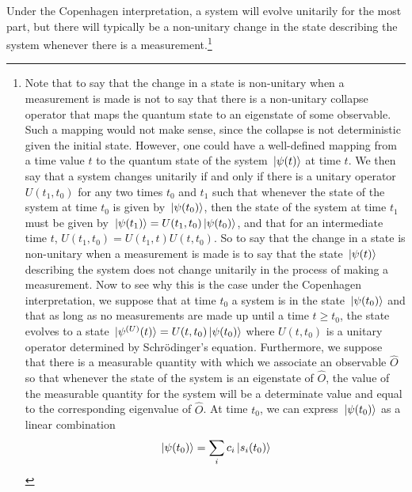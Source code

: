 Under the Copenhagen interpretation, a system will evolve unitarily for the most part, but there will typically be a non-unitary change in the state describing the system whenever there is a measurement.\footnote{Note that to say that the change in a state is non-unitary when a measurement is made is not to say that there is a non-unitary collapse operator that maps the quantum state to an eigenstate of some observable. Such a mapping would not make sense, since the collapse is not deterministic given the initial state. However, one could have a well-defined mapping from a time value $t$ to the quantum state of the system $\ket*{\psi(t)}$ at time $t$. We then say that a system changes unitarily if and only if there is a unitary operator $U(t_1,t_0)$ for any two times $t_0$ and $t_1$ such that whenever the state of the system at time $t_0$ is given by $\ket*{\psi(t_0)}$, then the state of the system at time $t_1$ must be given by $\ket*{\psi(t_1)}=U(t_1, t_0)\ket*{\psi(t_0)}$, and that for an intermediate time $t$, $U(t_1,t_0)=U(t_1, t)U(t, t_0).$ So to say that the change in a state is non-unitary when a measurement is made is to say that the state $\ket*{\psi(t)}$ describing the system does not change unitarily in the process of making a measurement. Now to see why this is the case under the Copenhagen interpretation, we suppose that at time $t_0$ a system is in the state $\ket*{\psi(t_0)}$ and that as long as no measurements are made up until a time $t\geq t_0$, the state evolves to a state $\ket*{\psi^{(U)}(t)}=U(t,t_0)\ket*{\psi(t_0)}$ where $U(t,t_0)$ is a unitary operator determined by Schr\"{o}dinger's equation. Furthermore, we suppose that there is a measurable quantity with which we associate an observable $\hat{O}$ so that whenever the state of the system is an eigenstate of $\hat{O}$, the value of the measurable quantity for the system will be a determinate value and equal to the corresponding eigenvalue of $\hat{O}$. At time $t_0$, we can express $\ket*{\psi(t_0)}$ as a linear combination
  $$\ket*{\psi(t_0)}=\sum_i c_i\ket*{s_i(t_0)}$$
}
